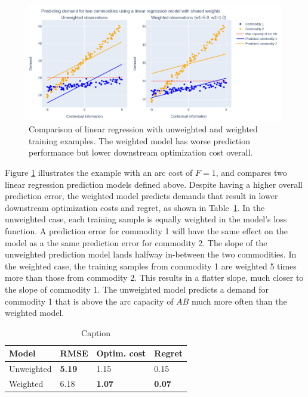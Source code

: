 \begin{figure}
    \centering
    \includegraphics[width=\textwidth]{res/img/metho-weightings.png}
    \caption{Comparison of linear regression with unweighted and weighted training examples. The weighted model has worse prediction performance but lower downstream optimization cost overall.}
    \label{fig:eval:weightings-graph}
\end{figure}

Figure \ref{fig:eval:weightings-graph} illustrates the example with an arc cost of $F=1$, and compares two linear regression prediction models defined above. Despite having a higher overall prediction error, the weighted model predicts demands that result in lower downstream optimization costs and regret, as shown in Table~\ref{tab:eval:weighting-results}. In the unweighted case, each training sample is equally weighted in the model's loss function. A prediction error for commodity 1 will have the same effect on the model as a the same prediction error for commodity 2. The slope of the unweighted prediction model lands halfway in-between the two commodities. In the weighted case, the training samples from commodity 1 are weighted 5 times more than those from commodity 2. This results in a flatter slope, much closer to the slope of commodity 1. The unweighted model predicts a demand for commodity 1 that is above the arc capacity of $AB$ much more often than the weighted model.

\begin{table}[h]
    \centering
    \begin{tabular}{ l l l l } 
    \hline
    Model &  RMSE & Optim. cost & Regret \\
    \hline
    Unweighted & \textbf{5.19} & 1.15 & 0.15\\ 
    Weighted & 6.18 & \textbf{1.07} & \textbf{0.07}\\
    \hline
    \end{tabular}
    \caption{Caption}
    \label{tab:eval:weighting-results}
\end{table}

